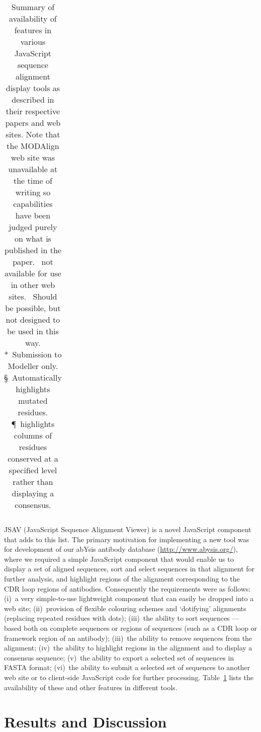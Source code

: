 \documentclass{article}
\begin{document}
\begin{table}
\begin{center}
\begin{tabularx}{\linewidth}{Xlllll}
\end{tabularx}
\end{center}
\caption{\label{tab:features}Summary of availability of features in
  various JavaScript sequence alignment display tools as described in
  their respective papers and web sites. Note that the MODAlign web
  site was unavailable at the time of writing so capabilities have
  been judged purely on what is published in the paper. \dag~not
  available for use in other web sites. \ddag~Should be possible,
  but not designed to be used in this way. *~Submission to Modeller
  only. \S~Automatically highlights mutated residues. \P~highlights
  columns of residues conserved at a specified level rather than
  displaying a consensus.} 
\end{table}

JSAV (JavaScript Sequence Alignment Viewer) is a novel JavaScript
component that adds to this list. The primary motivation for
implementing a new tool was for development of our abYsis antibody
database (\url{http://www.abysis.org/}), where we required a simple
JavaScript component that would enable us to display a set of aligned
sequences, sort and select sequences in that alignment for further
analysis, and highlight regions of the alignment corresponding to the
CDR loop regions of antibodies. Consequently the requirements were as
follows: (i)~a very simple-to-use lightweight component that can
easily be dropped into a web site; (ii)~provision of flexible
colouring schemes and `dotifying' alignments (replacing repeated
residues with dots); (iii)~the ability to sort sequences --- based
both on complete sequences or regions of sequences (such as a CDR loop
or framework region of an antibody); (iii)~the ability to remove
sequences from the alignment; (iv)~the ability to highlight regions in
the alignment and to display a consensus sequence; (v)~the ability to
export a selected set of sequences in FASTA format; (vi)~the ability
to submit a selected set of sequences to another web site or to
client-side JavaScript code for further processing.
Table~\ref{tab:features} lists the availability of these and other
features in different tools.

\section{Results and Discussion}
\end{document}
